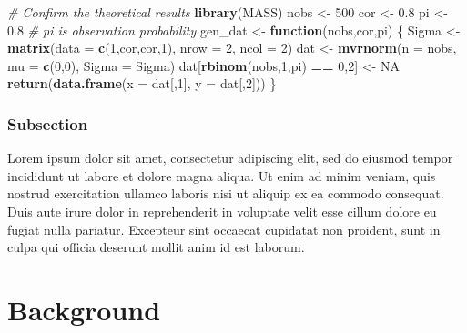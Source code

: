 \documentclass[
  12pt,
  openany, oneside]{book}
\newenvironment{Shaded}{\begin{snugshade}}{\end{snugshade}}
\newcommand{\AttributeTok}[1]{\textcolor[rgb]{0.13,0.29,0.53}{#1}}
\newcommand{\CommentTok}[1]{\textcolor[rgb]{0.56,0.35,0.01}{\textit{#1}}}
\newcommand{\ConstantTok}[1]{\textcolor[rgb]{0.56,0.35,0.01}{#1}}
\newcommand{\ControlFlowTok}[1]{\textcolor[rgb]{0.13,0.29,0.53}{\textbf{#1}}}
\newcommand{\DecValTok}[1]{\textcolor[rgb]{0.00,0.00,0.81}{#1}}
\newcommand{\FloatTok}[1]{\textcolor[rgb]{0.00,0.00,0.81}{#1}}
\newcommand{\FunctionTok}[1]{\textcolor[rgb]{0.13,0.29,0.53}{\textbf{#1}}}
\newcommand{\NormalTok}[1]{#1}
\newcommand{\OtherTok}[1]{\textcolor[rgb]{0.56,0.35,0.01}{#1}}
\newcommand{\SpecialCharTok}[1]{\textcolor[rgb]{0.81,0.36,0.00}{\textbf{#1}}}
\theoremstyle{definition}
\theoremstyle{definition}
\theoremstyle{definition}
\theoremstyle{definition}
\theoremstyle{remark}
\begin{document}
\begin{Shaded}
\begin{Highlighting}[]
\CommentTok{\# Confirm the theoretical results}
\FunctionTok{library}\NormalTok{(MASS)}
\NormalTok{nobs }\OtherTok{\textless{}{-}} \DecValTok{500}
\NormalTok{cor }\OtherTok{\textless{}{-}} \FloatTok{0.8}
\NormalTok{pi }\OtherTok{\textless{}{-}} \FloatTok{0.8} \CommentTok{\# pi is observation probability}
\NormalTok{gen\_dat }\OtherTok{\textless{}{-}} \ControlFlowTok{function}\NormalTok{(nobs,cor,pi) \{}
\NormalTok{  Sigma }\OtherTok{\textless{}{-}} \FunctionTok{matrix}\NormalTok{(}\AttributeTok{data =} \FunctionTok{c}\NormalTok{(}\DecValTok{1}\NormalTok{,cor,cor,}\DecValTok{1}\NormalTok{),}
                  \AttributeTok{nrow =} \DecValTok{2}\NormalTok{, }\AttributeTok{ncol =} \DecValTok{2}\NormalTok{)}
\NormalTok{  dat }\OtherTok{\textless{}{-}} \FunctionTok{mvrnorm}\NormalTok{(}\AttributeTok{n =}\NormalTok{ nobs, }\AttributeTok{mu =} \FunctionTok{c}\NormalTok{(}\DecValTok{0}\NormalTok{,}\DecValTok{0}\NormalTok{), }\AttributeTok{Sigma =}\NormalTok{ Sigma)}
\NormalTok{  dat[}\FunctionTok{rbinom}\NormalTok{(nobs,}\DecValTok{1}\NormalTok{,pi) }\SpecialCharTok{==} \DecValTok{0}\NormalTok{,}\DecValTok{2}\NormalTok{] }\OtherTok{\textless{}{-}} \ConstantTok{NA}
  \FunctionTok{return}\NormalTok{(}\FunctionTok{data.frame}\NormalTok{(}\AttributeTok{x =}\NormalTok{ dat[,}\DecValTok{1}\NormalTok{],}
                    \AttributeTok{y =}\NormalTok{ dat[,}\DecValTok{2}\NormalTok{]))}
\NormalTok{\}}
\end{Highlighting}
\end{Shaded}

\subsection{Subsection}\label{subsection}

Lorem ipsum dolor sit amet, consectetur adipiscing elit, sed do eiusmod tempor incididunt ut labore et dolore magna aliqua. Ut enim ad minim veniam, quis nostrud exercitation ullamco laboris nisi ut aliquip ex ea commodo consequat. Duis aute irure dolor in reprehenderit in voluptate velit esse cillum dolore eu fugiat nulla pariatur. Excepteur sint occaecat cupidatat non proident, sunt in culpa qui officia deserunt mollit anim id est laborum.

\chapter{Background}\label{background}
\end{document}
